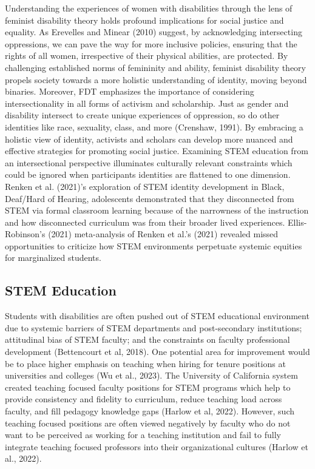 \documentclass{sig-alternate} %
\begin{document}
\begin{large}
Understanding the experiences of women with disabilities through the lens of feminist disability theory holds profound implications for social justice and equality. As Erevelles and Minear (2010) suggest, by acknowledging intersecting oppressions, we can pave the way for more inclusive policies, ensuring that the rights of all women, irrespective of their physical abilities, are protected. By challenging established norms of femininity and ability, feminist disability theory propels society towards a more holistic understanding of identity, moving beyond binaries. Moreover, FDT emphasizes the importance of considering intersectionality in all forms of activism and scholarship. Just as gender and disability intersect to create unique experiences of oppression, so do other identities like race, sexuality, class, and more (Crenshaw, 1991). By embracing a holistic view of identity, activists and scholars can develop more nuanced and effective strategies for promoting social justice. Examining STEM education from an intersectional perspective illuminates culturally relevant constraints which could be ignored when participants identities are flattened to one dimension. Renken et al. (2021)’s exploration of STEM identity development in Black, Deaf/Hard of Hearing, adolescents demonstrated that they disconnected from STEM via formal classroom learning because of the narrowness of the instruction and how disconnected curriculum was from their broader lived experiences. Ellis-Robinson’s (2021) meta-analysis of Renken et al.’s (2021) revealed missed opportunities to criticize how STEM environments perpetuate systemic equities for marginalized students. 

\subsection*{STEM Education}
Students with disabilities are often pushed out of STEM educational environment due to systemic barriers of STEM departments and post-secondary institutions; attitudinal bias of STEM faculty; and the constraints on faculty professional development (Bettencourt et al, 2018). One potential area for improvement would be to place higher emphasis on teaching when hiring for tenure positions at universities and colleges (Wu et al., 2023). The University of California system created teaching focused faculty positions for STEM programs which help to provide consistency and fidelity to curriculum, reduce teaching load across faculty, and fill pedagogy knowledge gaps (Harlow et al, 2022). However, such teaching focused positions are often viewed negatively by faculty who do not want to be perceived as working for a teaching institution and fail to fully integrate teaching focused professors into their organizational cultures (Harlow et al., 2022).


\end{large}
\end{document}
